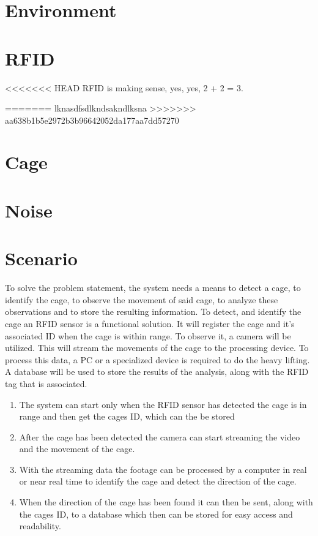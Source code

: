 \section{Environment}

\section{RFID}
<<<<<<< HEAD
RFID is making sense, yes, yes, 2 + 2 = 3.

=======
lknasdfsdlkndsakndlksna
>>>>>>> aa638b1b5e2972b3b96642052da177aa7dd57270

\section{Cage}

\section{Noise}

\section{Scenario}

To solve the problem statement, the system needs a means to detect a cage, to identify the cage, to observe the movement of said cage, to analyze these observations and to store the resulting information. To detect, and identify the cage an RFID sensor is a functional solution. It will register the cage and it's associated ID when the cage is within range. To observe it, a camera will be utilized. This will stream the movements of the cage to the processing device. To process this data, a PC or a specialized device is required to do the heavy lifting. A database will be used to store the results of the analysis, along with the RFID tag that is associated.

\begin{enumerate}
    \item The system can start only when the RFID sensor has detected the cage is in range and then get the cages ID, which can the be stored
    \item After the cage has been detected the camera can start streaming the video and the movement of the cage.
    \item With the streaming data the footage can be processed by a computer in real or near real time to identify the cage and detect the direction of the cage.
    \item When the direction of the cage has been found it can then be sent, along with the cages ID, to a database which then can be stored for easy access and readability.
\end{enumerate}

